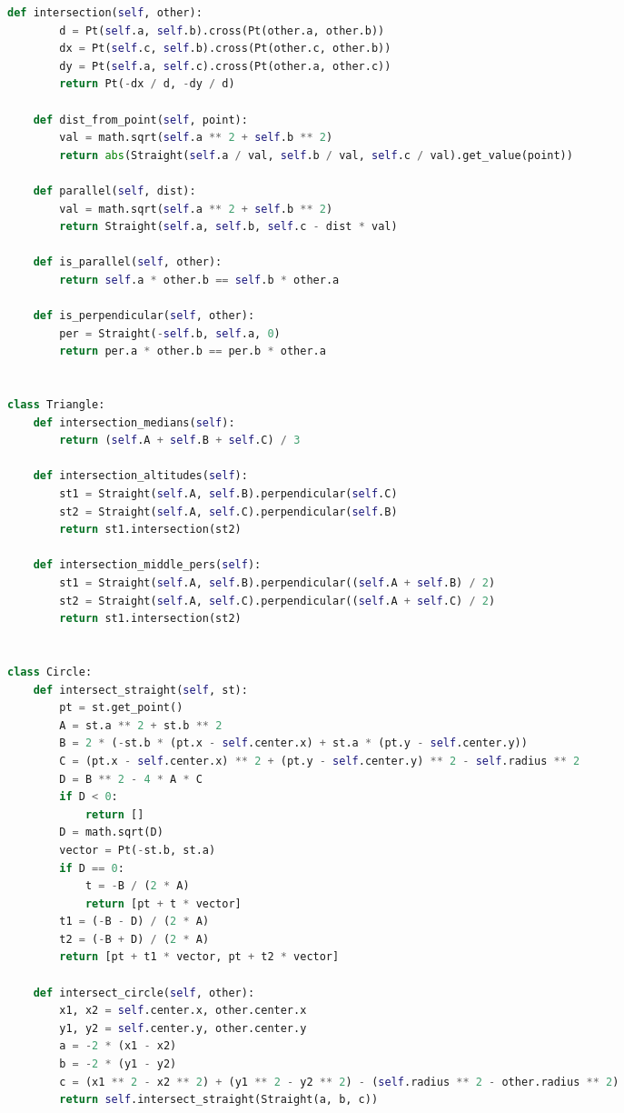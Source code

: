 \documentclass[10pt,a4paper,landscape,twosided]{extarticle}
\begin{document}
\begin{multicols}{3}
\begin{lstlisting}[language=Python]
    def intersection(self, other):
        d = Pt(self.a, self.b).cross(Pt(other.a, other.b))
        dx = Pt(self.c, self.b).cross(Pt(other.c, other.b))
        dy = Pt(self.a, self.c).cross(Pt(other.a, other.c))
        return Pt(-dx / d, -dy / d)

    def dist_from_point(self, point):
        val = math.sqrt(self.a ** 2 + self.b ** 2)
        return abs(Straight(self.a / val, self.b / val, self.c / val).get_value(point))

    def parallel(self, dist):
        val = math.sqrt(self.a ** 2 + self.b ** 2)
        return Straight(self.a, self.b, self.c - dist * val)

    def is_parallel(self, other):
        return self.a * other.b == self.b * other.a

    def is_perpendicular(self, other):
        per = Straight(-self.b, self.a, 0)
        return per.a * other.b == per.b * other.a


class Triangle:
    def intersection_medians(self):
        return (self.A + self.B + self.C) / 3

    def intersection_altitudes(self):
        st1 = Straight(self.A, self.B).perpendicular(self.C)
        st2 = Straight(self.A, self.C).perpendicular(self.B)
        return st1.intersection(st2)

    def intersection_middle_pers(self):
        st1 = Straight(self.A, self.B).perpendicular((self.A + self.B) / 2)
        st2 = Straight(self.A, self.C).perpendicular((self.A + self.C) / 2)
        return st1.intersection(st2)


class Circle:
    def intersect_straight(self, st):
        pt = st.get_point()
        A = st.a ** 2 + st.b ** 2
        B = 2 * (-st.b * (pt.x - self.center.x) + st.a * (pt.y - self.center.y))
        C = (pt.x - self.center.x) ** 2 + (pt.y - self.center.y) ** 2 - self.radius ** 2
        D = B ** 2 - 4 * A * C
        if D < 0:
            return []
        D = math.sqrt(D)
        vector = Pt(-st.b, st.a)
        if D == 0:
            t = -B / (2 * A)
            return [pt + t * vector]
        t1 = (-B - D) / (2 * A)
        t2 = (-B + D) / (2 * A)
        return [pt + t1 * vector, pt + t2 * vector]

    def intersect_circle(self, other):
        x1, x2 = self.center.x, other.center.x
        y1, y2 = self.center.y, other.center.y
        a = -2 * (x1 - x2)
        b = -2 * (y1 - y2)
        c = (x1 ** 2 - x2 ** 2) + (y1 ** 2 - y2 ** 2) - (self.radius ** 2 - other.radius ** 2)
        return self.intersect_straight(Straight(a, b, c))


\end{lstlisting}
\end{multicols}
\end{document}
